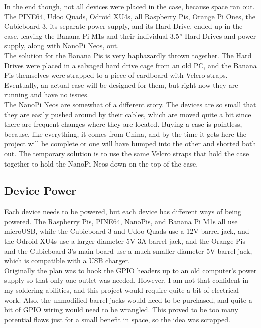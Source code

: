 \documentclass[12pt]{spieman}  %
\begin{document}
In the end though, not all devices were placed in the case, because space ran out. The PINE64, Udoo Quads, Odroid XU4s, all Raspberry Pis, Orange Pi Ones, the Cubieboard 3, its separate power supply, and its Hard Drive, ended up in the case, leaving the Banana Pi M1s and their individual 3.5” Hard Drives and power supply, along with NanoPi Neos, out.\\

The solution for the Banana Pis is very haphazardly thrown together. The Hard Drives were placed in a salvaged hard drive cage from an old PC, and the Banana Pis themselves were strapped to a piece of cardboard with Velcro straps. Eventually, an actual case will be designed for them, but right now they are running and have no issues.\\

The NanoPi Neos are somewhat of a different story. The devices are so small that they are easily pushed around by their cables, which are moved quite a bit since there are frequent changes where they are located. Buying a case is pointless, because, like everything, it comes from China, and by the time it gets here the project will be complete or one will have bumped into the other and shorted both out. The temporary solution is to use the same Velcro straps that hold the case together to hold the NanoPi Neos down on the top of the case.

\subsection{Device Power}
\label{subsec:power}

Each device needs to be powered, but each device has different ways of being powered. The Raspberry Pis, PINE64, NanoPis, and Banana Pi M1s all use microUSB, while the Cubieboard 3 and Udoo Quads use a 12V barrel jack, and the Odroid XU4s use a larger diameter 5V 3A barrel jack, and the Orange Pis and the Cubieboard 3’s main board use a much smaller diameter 5V barrel jack, which is compatible with a USB charger.\\

Originally the plan was to hook the GPIO headers up to an old computer’s power supply so that only one outlet was needed. However, I am not that confident in my soldering abilities, and this project would require quite a bit of electrical work. Also, the unmodified barrel jacks would need to be purchased, and quite a bit of GPIO wiring would need to be wrangled. This proved to be too many potential flaws just for a small benefit in space, so the idea was scrapped.\\
\end{document}
